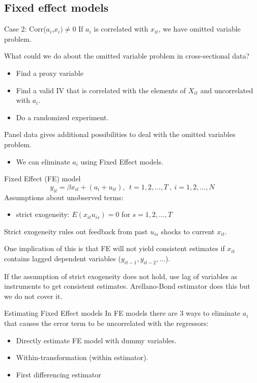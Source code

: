 \documentclass{beamer}
\begin{document}
\subsection{Fixed effect models}
\begin{frame}{Case 2: Corr($a_i$,$x_i)\neq 0$}
If $a_i$ is correlated with $x_{it}$, we have omitted variable problem.\bigskip

What could we do about the omitted variable problem in cross-sectional data?\pause
\begin{itemize}
\item Find a proxy variable
\item Find a valid IV that is correlated with the elements of $X_{it}$ and uncorrelated with $a_i$.
\item Do a randomized experiment.
\end{itemize}\medskip

Panel data gives additional possibilities to deal with the omitted variables problem.
\begin{itemize}
\item We can eliminate $a_i$ using Fixed Effect models.
\end{itemize}

\end{frame}

\begin{frame}{Fixed Effect (FE) model}
\vspace{-10pt}
\[y_{it} = \beta x_{it}+(a_i+u_{it}), \ \ t = 1,2,\dots,T \ , \  i = 1,2,\dots, N \]
Assumptions about unobserved terms:
\begin{itemize}
\item strict exogeneity: $E(x_{it}u_{is}) = 0$ for $s = 1,2,\dots,T$ 
\end{itemize}\medskip

Strict exogeneity rules out feedback from past $u_{is}$ shocks to current $x_{it}$.\medskip

One implication of this is that FE will not yield consistent estimates if $x_{it}$ contains lagged dependent variables ($y_{it-1}, y_{it-2} , \dots$).\bigskip

If the assumption of strict exogeneity does not hold, use lag of variables as instruments to get consistent estimates.  Arellano-Bond estimator does this but we do not cover it.
\end{frame}

\begin{frame}{Estimating Fixed Effect models}
In FE models there are 3 ways to eliminate $a_i$ that causes the error term to be uncorrelated with the regressors:
\begin{itemize}
\item Directly estimate FE model with dummy variables.
\item Within-transformation (within estimator).
\item First differencing estimator
\end{itemize}
\end{frame}
\end{document}

